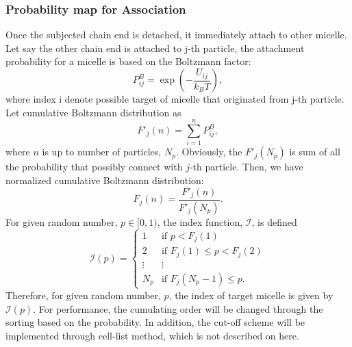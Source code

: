 \documentclass[10pt, a4paper]{article}
\begin{document}
\subsubsection{Probability map for Association}
Once the subjected chain end is detached, it immediately attach to other micelle. Let say the other chain end is attached to j-th particle, the attachment probability for a micelle is based on the Boltzmann factor:
\begin{equation}
P^{B}_{ij} = \exp\left(-\frac{{U}_{ij}}{k_BT}\right),
\end{equation}
where index i denote possible target of micelle that originated from j-th particle. 
Let cumulative Boltzmann distribution as
\begin{equation}
F'_j(n) = \sum_{i=1}^{n}P^{B}_{ij},
\end{equation}
where $n$ is up to number of particles, $N_p$. Obviously, the $F'_j(N_p)$ is sum of all the probability that possibly connect with $j$-th particle. Then, we have normalized cumulative Boltzmann distribution:
\begin{equation}
F_j(n) = \frac{F'_j(n)}{F'_j(N_p)}.
\end{equation}
For given random number, $p\in[0, 1)$, the index function, $\mathscr{I}$, is defined 
\begin{equation}
\mathscr{I}(p) = \left\{\begin{array}{cc} 1 & \textrm{if }  p < F_j(1) \\
2 & \textrm{if } F_j(1) \leq p < F_j(2) \\
\vdots & \vdots \\
N_p & \textrm{if } F_j(N_p - 1) \leq p.
\end{array}\right.
\end{equation}
Therefore, for given random number, $p$, the index of target micelle is given by $\mathscr{I}(p)$. For performance, the cumulating order will be changed through the sorting based on the probability. In addition, the cut-off scheme will be implemented through cell-list method, which is not described on here.
\end{document}
